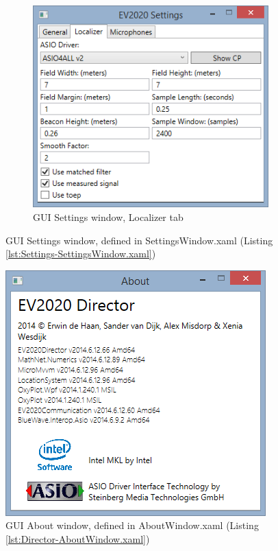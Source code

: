 \documentclass[final]{scrreprt} %
\begin{document}
\begin{appendices}
\begin{figure}[h]
\begin{subfigure}[t]{0.48\linewidth}
	\includegraphics[width=\linewidth]{resources/UI-Settings-Localizer.png}
	\caption{GUI Settings window, Localizer tab}
	\label{fig:UI-Settings-Localizer}
\end{subfigure}

\caption{GUI Settings window, defined in SettingsWindow.xaml (Listing \ref{lst:Settings-SettingsWindow.xaml})}
\label{fig:UI-Settings}
\end{figure}

\begin{figure}[h]
\centering
	\includegraphics[width=0.7\linewidth]{resources/UI-About.png}
	\caption{GUI About window, defined in AboutWindow.xaml (Listing \ref{lst:Director-AboutWindow.xaml})}
	\label{fig:UI-About}
\end{figure}


\end{appendices}
\end{document}
